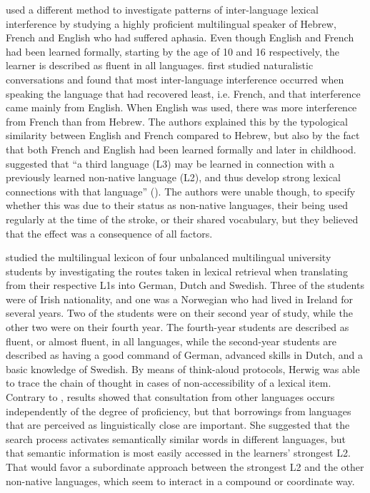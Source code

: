 \documentclass[output=paper,colorlinks,citecolor=brown,nonflat]{langsci/langscibook}
\begin{document}
\citet{GoralEtAl2006} used a different method to investigate patterns of inter-lan\-guage lexical interference by studying a highly proficient multilingual speaker of Hebrew, French and English who had suffered aphasia. Even though English and French had been learned formally, starting by the age of 10 and 16 respectively, the learner is described as fluent in all languages. \citeauthor{GoralEtAl2006} first studied naturalistic conversations and found that most inter-language interference occurred when speaking the language that had recovered least, i.e. French, and that interference came mainly from English. When English was used, there was more interference from French than from Hebrew. The authors explained this by the typological similarity between English and French compared to Hebrew, but also by the fact that both French and English had been learned formally and later in childhood. \citeauthor{GoralEtAl2006} suggested that “a third language (L3) may be learned in connection with a previously learned non-native language (L2), and thus develop strong lexical connections with that language” (\citealt[244]{GoralEtAl2006}). The authors were unable though, to specify whether this was due to their status as non-native languages, their being used regularly at the time of the stroke, or their shared vocabulary, but they believed that the effect was a consequence of all factors.

\citet{Herwig2001} studied the multilingual lexicon of four unbalanced multilingual university students by investigating the routes taken in lexical retrieval when translating from their respective L1s into German, Dutch and Swedish. Three of the students were of Irish nationality, and one was a Norwegian who had lived in Ireland for several years. Two of the students were on their second year of study, while the other two were on their fourth year. The fourth-year students are described as fluent, or almost fluent, in all languages, while the second-year students are described as having a good command of German, advanced skills in Dutch, and a basic knowledge of Swedish. By means of think-aloud protocols, Herwig was able to trace the chain of thought in cases of non-accessibility of a lexical item. Contrary to \citet{GoralEtAl2006}, results showed that consultation from other languages occurs independently of the degree of proficiency, but that borrowings from languages that are perceived as linguistically close are important. She suggested that the search process activates semantically similar words in different languages, but that semantic information is most easily accessed in the learners’ strongest L2. That would favor a subordinate approach between the strongest L2 and the other non-native languages, which seem to interact in a compound or coordinate way.
\end{document}

